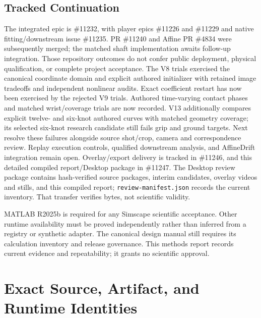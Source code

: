 \documentclass[11pt,letterpaper]{article}
\newcommand{\code}[1]{\nolinkurl{#1}}
\begin{document}
\subsection{Tracked Continuation}
The integrated epic is \#11232, with player epics \#11226 and \#11229 and
native fitting/downstream issue \#11235. PR \#11240 and Affine PR \#4834
were subsequently merged; the matched shaft implementation awaits follow-up
integration. Those repository outcomes do not confer public deployment,
physical qualification, or complete project acceptance.
The V8 trials exercised the canonical coordinate domain and explicit authored
initializer with retained image tradeoffs and independent nonlinear audits.
Exact coefficient restart has now been exercised by the rejected V9 trials.
Authored time-varying contact phases and matched wrist/coverage trials are
now recorded. V13 additionally compares explicit twelve- and six-knot
authored curves with matched geometry coverage; its selected six-knot
research candidate still fails grip and ground targets. Next resolve these
failures alongside source shot/crop, camera and correspondence review. Replay execution controls, qualified downstream analysis,
and AffineDrift integration remain open.
Overlay/export delivery is tracked in \#11246, and this detailed compiled
report/Desktop package in \#11247. The Desktop review package contains
hash-verified source packages, interim candidates, overlay videos and stills,
and this compiled report; \code{review-manifest.json} records the current
inventory. That transfer verifies bytes, not scientific validity.

MATLAB R2025b is required for any Simscape scientific acceptance. Other runtime
availability must be proved independently rather than inferred from a registry
or synthetic adapter. The canonical design manual still requires its
calculation inventory and release governance. This methods report records
current evidence and repeatability; it grants no scientific approval.

\appendix
\section{Exact Source, Artifact, and Runtime Identities}
\end{document}
